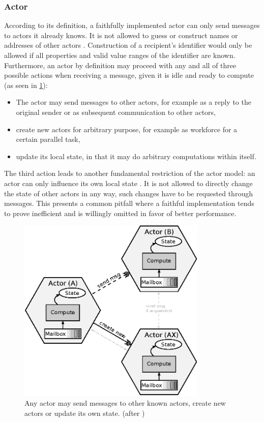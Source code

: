 \documentclass[A4]{article}
\begin{document}
\subsubsection{Actor}
According to its definition, a faithfully implemented actor can only send messages to actors it already knows. It is not allowed to guess or construct names or addresses of other actors \cite{reference/parallel/KarmaniA11}. Construction of a recipient's identifier would only be allowed if all properties and valid value ranges of the identifier are known. 
Furthermore, an actor by definition may proceed with any and all of three possible actions when receiving a message, given it is idle and ready to compute (as seen in \ref{Actors}): 
\begin{itemize}
\item The actor may send messages to other actors, for example as a reply to the original sender or as subsequent communication to other actors,
\item create new actors for arbitrary purpose, for example as workforce for a certain parallel task,
\item update its local state, in that it may do arbitrary computations within itself.
\end{itemize}
The third action leads to another fundamental restriction of the actor model: an actor can only influence its own local state . It is not allowed to directly change the state of other actors in any way, such changes have to be requested through messages\cite{reference/parallel/KarmaniA11}. This presents a common pitfall where a faithful implementation tends to prove inefficient and is willingly omitted in favor of better performance. 
\begin{figure}
\centerline{
\includegraphics[width=0.8\textwidth]{actorsExample.eps}
}
\caption{Any actor may send messages to other known actors, create new actors or update its own state. (after \cite[p.~1]{reference/parallel/KarmaniA11})}
\label{Actors}
\end{figure}
\end{document}
